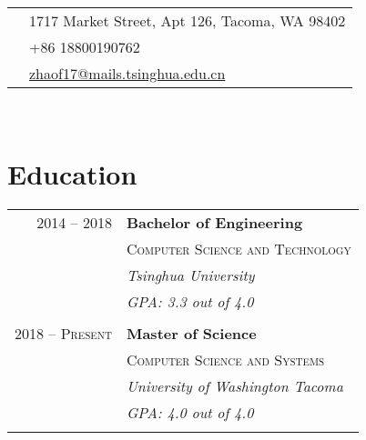 \documentclass[10pt]{article} %
\begin{document}
{\begin{minipage}[t]{0.44\textwidth}
\colorbox{shade}{\textcolor{text1}{
\begin{tabular}{c|p{7cm}}
\raisebox{-4pt}{\textifsymbol{18}} & 1717 Market Street, Apt 126, Tacoma, WA 98402 \\ %
\raisebox{-3pt}{\Mobilefone} & +86 18800190762 \\ %
\raisebox{-1pt}{\Letter} & \href{mailto:zhaof17@mails.tsinghua.edu.cn}{zhaof17@mails.tsinghua.edu.cn} \\ %
\end{tabular}
}
}\\[10pt]


\section{Education}

\begin{tabular}{rl} %


2014 -- 2018 & \textbf{Bachelor of Engineering} \\
& \textsc{Computer Science and Technology} \\
& \textit{Tsinghua University}\\
& \textit{GPA: 3.3 out of 4.0}\\
&\\

2018 -- \textsc{Present} & \textbf{Master of Science} \\
& \textsc{Computer Science and Systems} \\
& \textit{University of Washington Tacoma}\\
& \textit{GPA: 4.0 out of 4.0}\\
&\\


\end{tabular}\\[10pt]



\end{minipage}}
\end{document}

